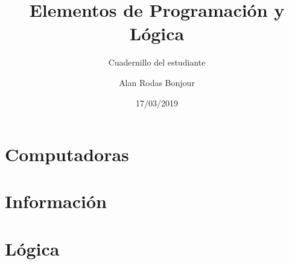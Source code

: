 \documentclass[11pt,fleqn]{book} %
\begin{document}

\title{Elementos de Programación y Lógica}
\subtitle{Cuadernillo del estudiante}
\author{Alan Rodas Bonjour}
\date{17/03/2019}


\maketitle





\setlength{\parskip}{0.5em}




\part{Computadoras}
\label{Computadoras}

\begin{refsection}


\newpage
\printbibliography[heading=subbibliography]
\end{refsection}


\part{Información}
\label{Información}

\begin{refsection}



\newpage
\printbibliography[heading=subbibliography]
\end{refsection}


\part{Lógica}
\label{Lógica}
\end{document}
